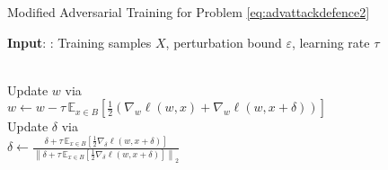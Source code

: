 \begin{algorithm}
\caption{Modified Adversarial Training for Problem \eqref{eq:advattackdefence2}}\label{Alg_4}

 \textbf{Input}: : Training samples $X$, perturbation bound $\varepsilon$, learning rate $\tau$\\
\begin{algorithmic}[1]


 \\
\hspace{\algorithmicindent} Update $w$ via \\
\hspace{\algorithmicindent} \hspace{\algorithmicindent} $w \gets w - \tau \, \mathbb{E}_{x \in B} \left[\frac12 \left( \nabla_w \ell(w,x) + \nabla_w \ell(w,x+\delta) \right)\right]$ \\
\hspace{\algorithmicindent} Update $\delta$ via \\
\hspace{\algorithmicindent} \hspace{\algorithmicindent} $\delta \gets \frac{\delta + \tau \, \mathbb{E}_{x \in B}\left[\frac12 \nabla_{\delta} \ell(w,x + \delta)\right]}{\left\| \delta + \tau \, \mathbb{E}_{x \in B}\left[\frac12 \nabla_{\delta} \ell(w,x + \delta)\right]  \right\|_2}$ \\

\EndFor
\EndFor
\end{algorithmic}
\end{algorithm}